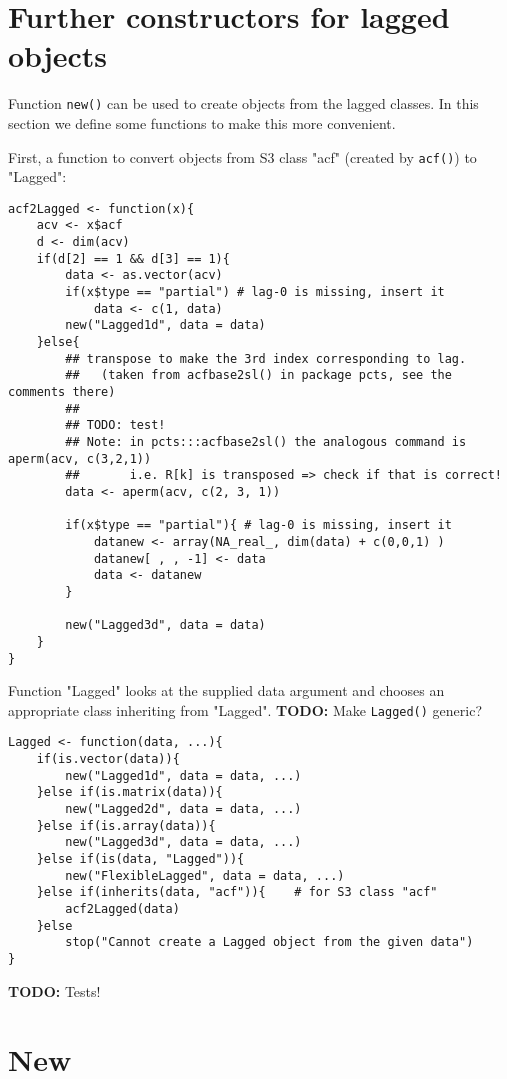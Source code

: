 \documentclass[11pt,a4paper]{article}
\begin{document}
\section{Further constructors for lagged objects}
\label{sec:org94c0c15}

Function \texttt{new()} can be used to create objects from the lagged classes.
In this section we define some functions to make this more convenient.

First, a function to convert objects from S3 class "acf" (created by \texttt{acf()}) to "Lagged":
\begin{verbatim}
acf2Lagged <- function(x){
    acv <- x$acf
    d <- dim(acv)
    if(d[2] == 1 && d[3] == 1){
        data <- as.vector(acv)
        if(x$type == "partial") # lag-0 is missing, insert it
            data <- c(1, data)
        new("Lagged1d", data = data)
    }else{
        ## transpose to make the 3rd index corresponding to lag.
        ##   (taken from acfbase2sl() in package pcts, see the comments there)
        ##
        ## TODO: test!
        ## Note: in pcts:::acfbase2sl() the analogous command is aperm(acv, c(3,2,1))
        ##       i.e. R[k] is transposed => check if that is correct!
        data <- aperm(acv, c(2, 3, 1))

        if(x$type == "partial"){ # lag-0 is missing, insert it
            datanew <- array(NA_real_, dim(data) + c(0,0,1) )
            datanew[ , , -1] <- data
            data <- datanew
        }

        new("Lagged3d", data = data)
    }
}
\end{verbatim}


Function "Lagged" looks at the supplied data argument and chooses an appropriate class
inheriting from "Lagged". \textbf{TODO:} Make \texttt{Lagged()} generic?
\begin{verbatim}
Lagged <- function(data, ...){
    if(is.vector(data)){
        new("Lagged1d", data = data, ...)
    }else if(is.matrix(data)){
        new("Lagged2d", data = data, ...)
    }else if(is.array(data)){
        new("Lagged3d", data = data, ...)
    }else if(is(data, "Lagged")){
        new("FlexibleLagged", data = data, ...)
    }else if(inherits(data, "acf")){    # for S3 class "acf"
        acf2Lagged(data)
    }else
        stop("Cannot create a Lagged object from the given data")
}
\end{verbatim}

\textbf{TODO:} Tests!

\section{New}
\label{sec:org732c847}
\end{document}
